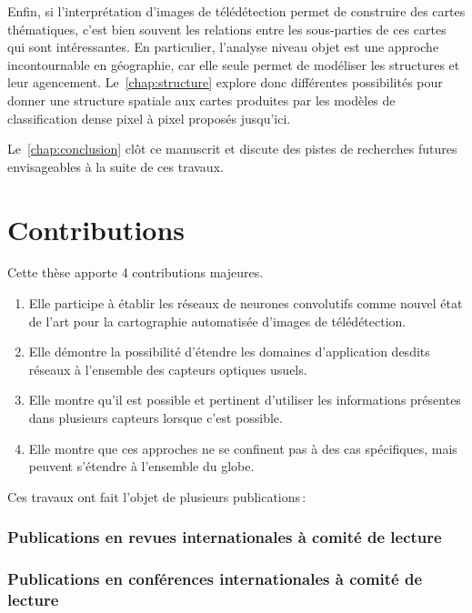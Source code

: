 Enfin, si l'interprétation d'images de télédétection permet de construire des cartes thématiques, c'est bien souvent les relations entre les sous-parties de ces cartes qui sont intéressantes. En particulier, l'analyse niveau objet est une approche incontournable en géographie, car elle seule permet de modéliser les structures et leur agencement. Le~\cref{chap:structure} explore donc différentes possibilités pour donner une structure spatiale aux cartes produites par les modèles de classification dense pixel à pixel proposés jusqu'ici.

Le~\cref{chap:conclusion} clôt ce manuscrit et discute des pistes de recherches futures envisageables à la suite de ces travaux.

\section{Contributions}

Cette thèse apporte 4 contributions majeures.
\begin{enumerate}
  \item Elle participe à établir les réseaux de neurones convolutifs comme nouvel état de l'art pour la cartographie automatisée d'images de télédétection.
  \item Elle démontre la possibilité d'étendre les domaines d'application desdits réseaux à l'ensemble des capteurs optiques usuels.
  \item Elle montre qu'il est possible et pertinent d'utiliser les informations présentes dans plusieurs capteurs lorsque c'est possible.
  \item Elle montre que ces approches ne se confinent pas à des cas spécifiques, mais peuvent s'étendre à l'ensemble du globe.
\end{enumerate}

Ces travaux ont fait l'objet de plusieurs publications\,:

\subsubsection*{Publications en revues internationales à comité de lecture}



\subsubsection*{Publications en conférences internationales à comité de lecture}






\medskip



%
%
